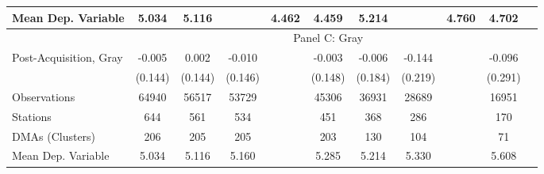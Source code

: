 {\begin{tabular}{l*{10}{c}}
Mean Dep. Variable&    5.034   &    5.116   &         &    4.462   &    4.459   &    5.214   &         &    4.760   &    4.702   \\
\midrule \ & \multicolumn{9}{c}{Panel C: Gray} \\\cmidrule(lr){2-10}
Post-Acquisition, Gray&   -0.005   &    0.002   &   -0.010   &         &   -0.003   &   -0.006   &   -0.144   &         &   -0.096   \\
                &  (0.144)   &  (0.144)   &  (0.146)   &         &  (0.148)   &  (0.184)   &  (0.219)   &         &  (0.291)   \\
\midrule
Observations    &    64940   &    56517   &    53729   &         &    45306   &    36931   &    28689   &         &    16951   \\
Stations        &      644   &      561   &      534   &         &      451   &      368   &      286   &         &      170   \\
DMAs (Clusters) &      206   &      205   &      205   &         &      203   &      130   &      104   &         &       71   \\
Mean Dep. Variable&    5.034   &    5.116   &    5.160   &         &    5.285   &    5.214   &    5.330   &         &    5.608   \\
\bottomrule \end{tabular}}
